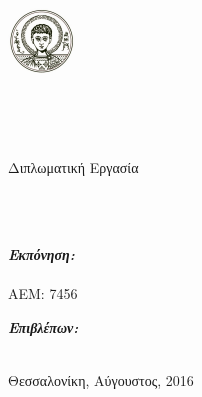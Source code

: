 \documentclass[
11pt, %
twoside, %
english,
headsepline, %
]{MastersDoctoralThesis} %
\author{Κούρος Γεώργιος}
\begin{document}
\frontmatter %
\pagestyle{plain}


\begin{titlepage}
\begin{center}

\includegraphics{images/auth_logo.png}\\[0.2cm]
{\large \univname}\\ [0.2cm]
{\large \facname}\\ [0.2cm]
\deptname\\
\groupname\\[3cm]


{\LARGE Διπλωματική Εργασία}\\[1cm] %

\HRule \\[0.4cm] %
{\huge \bfseries \ttitle\par}\vspace{0.4cm} %
\HRule \\[3cm] %

\begin{minipage}[t]{0.4\textwidth}
\begin{flushleft} \large
\emph{\textbf{Εκπόνηση:}}\\ 
\authorname\\
ΑΕΜ: 7456
\end{flushleft}
\end{minipage}
\begin{minipage}[t]{0.4\textwidth}
\begin{flushright} \large
\emph{\textbf{Επιβλέπων:}} \\
\supname %
\end{flushright}
\end{minipage}\\[3cm]


\vfill
{\large Θεσσαλονίκη, Αύγουστος, 2016} %
\end{center}
\end{titlepage}
\end{document}
